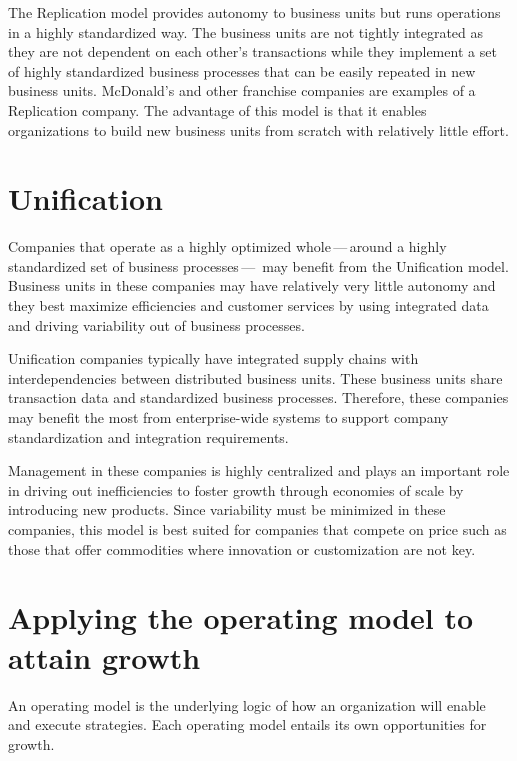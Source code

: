 The Replication model provides autonomy to business units but runs operations in a highly standardized way.
The business units are not tightly integrated as they are not dependent on each other’s transactions while they
implement a set of highly standardized business processes that can be easily repeated in new business units.
McDonald’s and other franchise companies are examples of a Replication company.
The advantage of this model is that it enables organizations to build new business units from scratch
with relatively little effort.

\section*{Unification}

Companies that operate as a highly optimized whole\,---\,around a highly standardized set of business processes\,---\,%
may benefit from the Unification model.
Business units in these companies may have relatively very little autonomy and they best maximize efficiencies and
customer services by using integrated data and driving variability out of business processes.

Unification companies typically have integrated supply chains with interdependencies between distributed business units.
These business units share transaction data and standardized business processes.
Therefore, these companies may benefit the most from enterprise-wide systems to support company standardization
and integration requirements.

Management in these companies is highly centralized and plays an important role in driving out inefficiencies to
foster growth through economies of scale by introducing new products.
Since variability must be minimized in these companies,
this model is best suited for companies that compete on price such as those that offer commodities where
innovation or customization are not key.

\section*{Applying the operating model to attain growth}

An operating model is the underlying logic of how an organization will enable and execute strategies.
Each operating model entails its own opportunities for growth.

